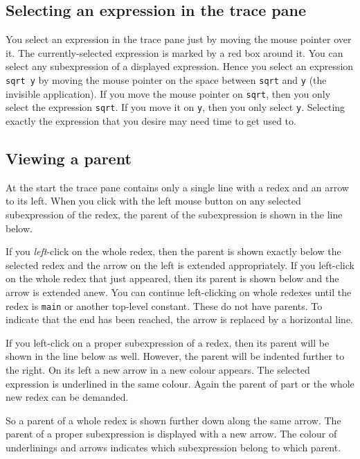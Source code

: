 \documentclass[12pt]{article}
\begin{document}
\subsection{Selecting an expression in the trace pane}

You select an expression in the trace pane just by moving the mouse pointer over it. The currently-selected expression is marked by a red box around it. You can select any subexpression of a displayed expression. Hence you select an expression \texttt{sqrt y} by moving the mouse pointer on the space between \texttt{sqrt} and \texttt{y} (the invisible application). If you move the mouse pointer on \texttt{sqrt}, then you only select the expression \texttt{sqrt}. If you move it on \texttt{y}, then you only select \texttt{y}.
Selecting exactly the expression that you desire may need time to get used to.

\subsection{Viewing a parent}

At the start the trace pane contains only a single line with a redex and an arrow to its left. When you click with the left mouse button on any selected subexpression of the redex, the parent of the subexpression is shown in the line below.

If you \emph{left}-click on the whole redex, then the parent is shown exactly below the selected redex and the arrow on the left is extended appropriately. If you left-click on the whole redex that just appeared, then its parent is shown below and the arrow is extended anew. You can continue left-clicking on whole redexes until the redex is \texttt{main} or another top-level constant. These do not have parents. To indicate that the end has been reached, the arrow is replaced by a horizontal line.

If you left-click on a proper subexpression of a redex, then its parent will be shown in the line below as well. However, the parent will be indented further to the right. On its left a new arrow in a new colour appears. The selected expression is underlined in the same colour. Again the parent of part or the whole new redex can be demanded.

So a parent of a whole redex is shown further down along the same arrow.
The parent of a proper subexpression is displayed with a new arrow. The colour of underlinings and arrows indicates which subexpression belong to which parent. 
\end{document}
